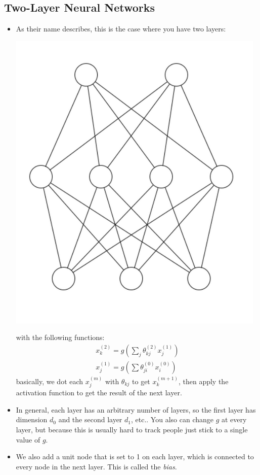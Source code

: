 \subsection{Two-Layer Neural Networks}
\begin{itemize}
	\item As their name describes, this is the case where you have two layers:
		\begin{center}
			\includegraphics[scale=0.6]{images/two-layer-NN.png}
		\end{center}
		with the following functions:
		\begin{align*}
			x_k^{(2)} = g\left( \sum_j \theta_{kj}^{(2)} x_{j}^{(1)} \right)\\
			x_{j}^{(1)} = g\left( \sum \theta_{ji}^{(0)} x_i^{(0)} \right)
		\end{align*}
		basically, we dot each \( x_j^{(m)} \) with \( \theta_{kj} \) to get \(
		x_k^{(m + 1)} \), then apply the activation function to get the result of the
		next layer. 
	\item In general, each layer has an arbitrary number of layers, so the first
		layer has dimension \( d_0 \) and the second layer \( d_1 \), etc.. You also
		can change \( g \) at every layer, but because this is usually hard to track
		people just stick to a single value of \( g \). 
	\item We also add a unit node that is set to 1 on each layer, which is connected
		to every node in the next layer. This is called the \textit{bias}. 


\end{itemize}
